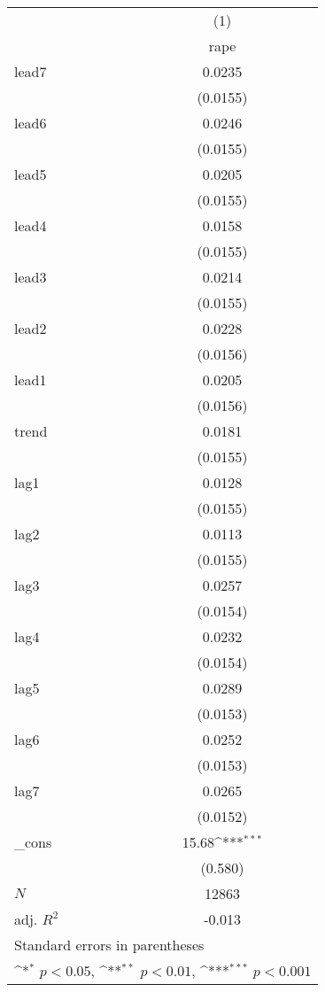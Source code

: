 {
\def\sym#1{\ifmmode^{#1}\else\(^{#1}\)\fi}
\begin{tabular}{l*{1}{c}}
\hline\hline
            &\multicolumn{1}{c}{(1)}\\
            &\multicolumn{1}{c}{rape}\\
\hline
lead7       &      0.0235         \\
            &    (0.0155)         \\
[1em]
lead6       &      0.0246         \\
            &    (0.0155)         \\
[1em]
lead5       &      0.0205         \\
            &    (0.0155)         \\
[1em]
lead4       &      0.0158         \\
            &    (0.0155)         \\
[1em]
lead3       &      0.0214         \\
            &    (0.0155)         \\
[1em]
lead2       &      0.0228         \\
            &    (0.0156)         \\
[1em]
lead1       &      0.0205         \\
            &    (0.0156)         \\
[1em]
trend       &      0.0181         \\
            &    (0.0155)         \\
[1em]
lag1        &      0.0128         \\
            &    (0.0155)         \\
[1em]
lag2        &      0.0113         \\
            &    (0.0155)         \\
[1em]
lag3        &      0.0257         \\
            &    (0.0154)         \\
[1em]
lag4        &      0.0232         \\
            &    (0.0154)         \\
[1em]
lag5        &      0.0289         \\
            &    (0.0153)         \\
[1em]
lag6        &      0.0252         \\
            &    (0.0153)         \\
[1em]
lag7        &      0.0265         \\
            &    (0.0152)         \\
[1em]
\_cons      &       15.68\sym{***}\\
            &     (0.580)         \\
\hline
\(N\)       &       12863         \\
adj. \(R^{2}\)&      -0.013         \\
\hline\hline
\multicolumn{2}{l}{\footnotesize Standard errors in parentheses}\\
\multicolumn{2}{l}{\footnotesize \sym{*} \(p<0.05\), \sym{**} \(p<0.01\), \sym{***} \(p<0.001\)}\\
\end{tabular}
}
